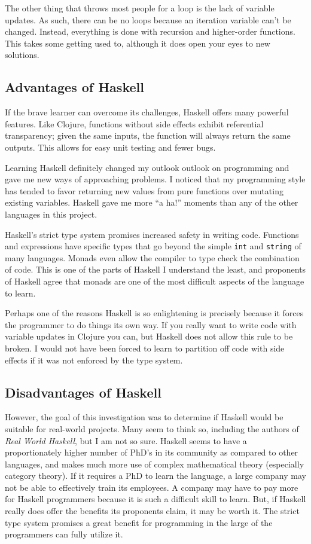 \documentclass{article}
\begin{document}
The other thing that throws most people for a loop is the lack of variable
updates.  As such, there can be no loops because an iteration variable can't
be changed.  Instead, everything is done with recursion and higher-order
functions.  This takes some getting used to, although it does open your eyes to
new solutions.

\subsection{Advantages of Haskell}

If the brave learner can overcome its challenges, Haskell offers many powerful
features.  Like Clojure, functions without side effects exhibit referential
transparency; given the same inputs, the function will always return the same
outputs.  This allows for easy unit testing and fewer bugs.

Learning Haskell definitely changed my outlook outlook on programming and gave
me new ways of approaching problems.  I noticed that my programming style has
tended to favor returning new values from pure functions over mutating existing
variables.  Haskell gave me more ``a ha!'' moments than any of the other languages in
this project.

Haskell's strict type system promises increased safety in writing code.
Functions and expressions have specific types that go beyond the simple
\texttt{int} and \texttt{string} of many languages.  Monads even allow the
compiler to type check the combination of code.  This is one of the parts of
Haskell I understand the least, and proponents of Haskell agree that monads are
one of the most difficult aspects of the language to learn.

Perhaps one of the reasons Haskell is so enlightening is precisely because it
forces the programmer to do things its own way.  If you really want to write
code with variable updates in Clojure you can, but Haskell does not allow this
rule to be broken.  I would not have been forced to learn to partition off code
with side effects if it was not enforced by the type system.

\subsection{Disadvantages of Haskell}

However, the goal of this investigation was to determine if Haskell would be
suitable for real-world projects.  Many seem to think so, including the authors
of \emph{Real World Haskell}, but I am not so sure.  Haskell seems to have
a proportionately higher number of PhD's in its community as compared to other
languages, and makes much more use of complex mathematical theory (especially
category theory).  If it requires a PhD to learn the language, a large company
may not be able to effectively train its employees.  A company may have to pay
more for Haskell programmers because it is such a difficult skill to learn.
But, if Haskell really does offer the benefits its proponents claim, it may be
worth it.  The strict type system promises a great benefit for programming in
the large of the programmers can fully utilize it.
\end{document}

